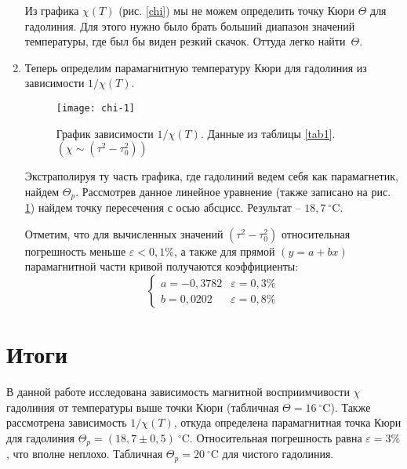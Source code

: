 \documentclass{lab}
\newcommand{\Cd}{^{\circ}\mathrm{C}}
\begin{document}
\begin{enumerate}
Из графика $ \chi(T) $ (рис. \ref{chi}) мы не можем определить точку Кюри $ \Theta $ для
гадолиния. Для этого нужно было брать больший диапазон значений температуры, где был бы виден
резкий скачок. Оттуда легко найти~$ \Theta $.

\item
Теперь определим парамагнитную температуру Кюри для гадолиния из зависимости $ 1/\chi(T) $.
\vspace{-0.5cm}
\begin{figure}[H]
	\centering
	\texttt{[image: chi-1]}
	\caption{\footnotesize
		График зависимости $ 1/\chi(T) $. Данные из таблицы \ref{tab1}.\\
		$ \left( \chi \sim (\tau^2 - \tau_0^2) \right) $
	}
	\label{chi-1}
\end{figure}
\vspace{-0.5cm}
Экстраполируя ту часть графика, где гадолиний ведем себя как парамагнетик, найдем $ \Theta_p $.
Рассмотрев данное линейное уравнение (также записано на рис. \ref{chi-1}) найдем точку
пересечения с осью абсцисс. Результат -- $ 18,7~\Cd $.

Отметим, что для вычисленных значений $ (\tau^2 - \tau_0^2) $ относительная погрешность
меньше $ \varepsilon < 0,1\% $, а также для прямой $ (y = a + bx) $ парамагнитной части кривой
получаются коэффициенты:
\vspace{-0.4cm}
\begin{equation}
\begin{cases}
a = -0,3782		&\varepsilon = 0,3\%	\\
b = 0,0202		&\varepsilon = 0,8\%
\end{cases}
\end{equation}
\end{enumerate}

\section*{Итоги}
\hspace*{\parindent}
В данной работе исследована зависимость магнитной восприимчивости $ \chi $ гадолиния от
температуры выше точки Кюри (табличная $ \Theta = 16~\Cd $). Также рассмотрена зависимость
$ 1/\chi(T) $, откуда определена парамагнитная точка Кюри для гадолиния
$ \Theta_p = (18,7 \pm 0,5)~\Cd $. Относительная погрешность равна $ \varepsilon = 3\% $, что
вполне неплохо. Табличная $ \Theta_p = 20~\Cd $ для чистого гадолиния.

\newpage
\end{document}
